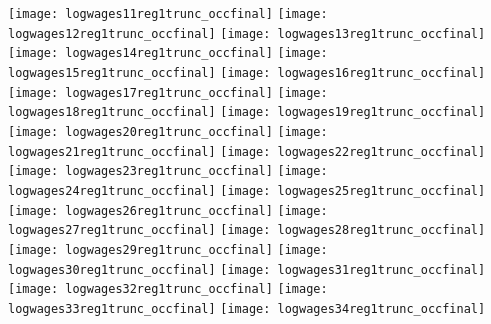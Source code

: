 \documentclass[11pt]{article}
\begin{document}
\texttt{[image: logwages11reg1trunc\_occfinal]}
\newline
\texttt{[image: logwages12reg1trunc\_occfinal]}
\clearpage
\texttt{[image: logwages13reg1trunc\_occfinal]}
\newline
\texttt{[image: logwages14reg1trunc\_occfinal]}
\clearpage
\texttt{[image: logwages15reg1trunc\_occfinal]}
\newline
\texttt{[image: logwages16reg1trunc\_occfinal]}
\clearpage
\texttt{[image: logwages17reg1trunc\_occfinal]}
\newline
\texttt{[image: logwages18reg1trunc\_occfinal]}
\clearpage
\texttt{[image: logwages19reg1trunc\_occfinal]}
\newline
\texttt{[image: logwages20reg1trunc\_occfinal]}
\clearpage
\texttt{[image: logwages21reg1trunc\_occfinal]}
\newline
\texttt{[image: logwages22reg1trunc\_occfinal]}
\clearpage
\texttt{[image: logwages23reg1trunc\_occfinal]}
\newline
\texttt{[image: logwages24reg1trunc\_occfinal]}
\clearpage
\texttt{[image: logwages25reg1trunc\_occfinal]}
\newline
\texttt{[image: logwages26reg1trunc\_occfinal]}
\clearpage
\texttt{[image: logwages27reg1trunc\_occfinal]}
\newline
\texttt{[image: logwages28reg1trunc\_occfinal]}
\clearpage
\texttt{[image: logwages29reg1trunc\_occfinal]}
\newline
\texttt{[image: logwages30reg1trunc\_occfinal]}
\clearpage
\texttt{[image: logwages31reg1trunc\_occfinal]}
\newline
\texttt{[image: logwages32reg1trunc\_occfinal]}
\clearpage
\texttt{[image: logwages33reg1trunc\_occfinal]}
\newline
\texttt{[image: logwages34reg1trunc\_occfinal]}
\end{document}
